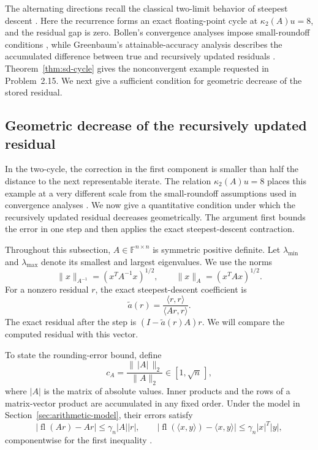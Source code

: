 \documentclass[11pt]{article}
\theoremstyle{definition}
\newcommand{\fl}{\operatorname{fl}}
\begin{document}
The alternating directions recall the classical two-limit behavior of
steepest descent \cite[Sec.~2.7]{OpenProblems2026}.  Here the recurrence
forms an exact floating-point cycle at $\kappa_2(A)u=8$, and the residual
gap is zero.  Bollen's convergence analyses impose small-roundoff
conditions \cite{Bollen1979,Bollen1984}, while Greenbaum's attainable-accuracy
analysis describes the accumulated difference between true and recursively
updated residuals \cite{Greenbaum1997Residual}.  Theorem~\ref{thm:sd-cycle}
gives the nonconvergent example requested in Problem~2.15.
We next give a sufficient condition for geometric decrease of the stored
residual.
\subsection{Geometric decrease of the recursively updated residual}
\label{sec:sd-positive}

In the two-cycle, the correction in the first component is smaller than
half the distance to the next representable iterate.  The relation
$\kappa_2(A)u=8$ places this example at a very different scale from the
small-roundoff assumptions used in convergence analyses
\cite{Bollen1984}.  We now give a quantitative condition under which the
recursively updated residual decreases geometrically.  The argument first
bounds the error in one step and then applies the exact steepest-descent
contraction.

Throughout this subsection, $A\in\mathbb F^{n\times n}$ is symmetric positive
definite. Let $\lambda_{\min}$ and $\lambda_{\max}$ denote its smallest and
largest eigenvalues.
We use the norms
\[
 \|x\|_{A^{-1}}=(x^TA^{-1}x)^{1/2},
 \qquad
 \|x\|_A=(x^TAx)^{1/2}.
\]
For a nonzero residual $r$, the exact steepest-descent coefficient is
\[
 \tilde a(r)=\frac{\langle r,r\rangle}{\langle Ar,r\rangle}.
\]
The exact residual after the step is $(I-\tilde a(r)A)r$.
We will compare the computed residual with this vector.

To state the rounding-error bound, define
\[
 c_A=\frac{\|\,|A|\,\|_2}{\|A\|_2}\in[1,\sqrt n\,],
\]
where $|A|$ is the matrix of absolute values. Inner products and the rows
of a matrix-vector product are accumulated in any fixed order. Under the
model in Section~\ref{sec:arithmetic-model}, their errors satisfy
\[
 |\fl(Ar)-Ar|\le\gamma_n|A||r|,
 \qquad
 |\fl(\langle x,y\rangle)-\langle x,y\rangle|
 \le\gamma_n|x|^T|y|,
\]
componentwise for the first inequality \cite[Sec.~3.5]{Higham2002}.
\end{document}
